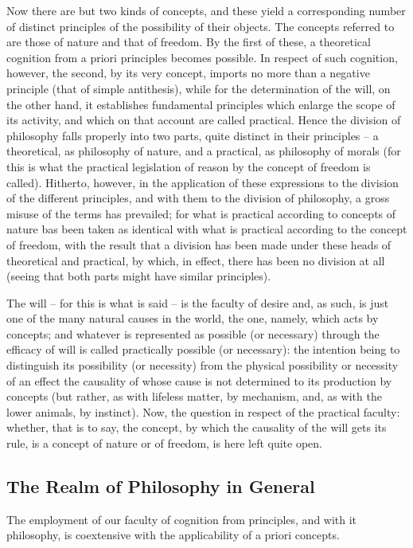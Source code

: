 \documentclass[12pt]{article}
\begin{document}
  Now there are but two kinds of concepts, and these yield a
corresponding number of distinct principles of the possibility of
their objects. The concepts referred to are those of nature and that
of freedom. By the first of these, a theoretical cognition from a
priori principles becomes possible. In respect of such cognition,
however, the second, by its very concept, imports no more than a
negative principle (that of simple antithesis), while for the
determination of the will, on the other hand, it establishes
fundamental principles which enlarge the scope of its activity, and
which on that account are called practical. Hence the division of
philosophy falls properly into two parts, quite distinct in their
principles -- a theoretical, as philosophy of nature, and a practical, as
philosophy of morals (for this is what the practical legislation of
reason by the concept of freedom is called). Hitherto, however, in the
application of these expressions to the division of the different
principles, and with them to the division of philosophy, a gross
misuse of the terms has prevailed; for what is practical according
to concepts of nature bas been taken as identical with what is
practical according to the concept of freedom, with the result that
a division has been made under these heads of theoretical and
practical, by which, in effect, there has been no division at all
(seeing that both parts might have similar principles).

  The will -- for this is what is said -- is the faculty of desire and, as
such, is just one of the many natural causes in the world, the one,
namely, which acts by concepts; and whatever is represented as
possible (or necessary) through the efficacy of will is called
practically possible (or necessary): the intention being to
distinguish its possibility (or necessity) from the physical
possibility or necessity of an effect the causality of whose cause
is not determined to its production by concepts (but rather, as with
lifeless matter, by mechanism, and, as with the lower animals, by
instinct). Now, the question in respect of the practical faculty:
whether, that is to say, the concept, by which the causality of the
will gets its rule, is a concept of nature or of freedom, is here left
quite open.

\subsection{The Realm of Philosophy in General}
The employment of our faculty of cognition from principles, and with
it philosophy, is coextensive with the applicability of a priori
concepts.
\end{document}

